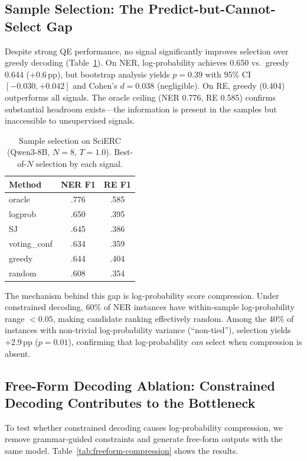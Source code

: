 \documentclass[11pt,a4paper]{article}
\begin{document}
\subsection{Sample Selection: The Predict-but-Cannot-Select Gap}
\label{sec:selection}

Despite strong QE performance, no signal significantly improves selection over greedy decoding (Table~\ref{tab:selection-scierc}). On NER, log-probability achieves 0.650 vs.\ greedy 0.644 (+0.6\,pp), but bootstrap analysis yields $p{=}0.39$ with 95\% CI $[-0.030, +0.042]$ and Cohen's $d{=}0.038$ (negligible). On RE, greedy (0.404) outperforms all signals. The oracle ceiling (NER 0.776, RE 0.585) confirms substantial headroom exists---the information is present in the samples but inaccessible to unsupervised signals.

\begin{table}[t]
\centering
\small
\caption{Sample selection on SciERC (Qwen3-8B, $N{=}8$, $T{=}1.0$). Best-of-$N$ selection by each signal.}
\label{tab:selection-scierc}
\begin{tabular}{lcc}
\toprule
Method & NER F1 & RE F1 \\
\midrule
oracle & .776 & .585 \\
logprob & .650 & .395 \\
SJ & .645 & .386 \\
voting\_conf & .634 & .359 \\
greedy & .644 & .404 \\
random & .608 & .354 \\
\bottomrule
\end{tabular}
\end{table}

The mechanism behind this gap is log-probability score compression. Under constrained decoding, 60\% of NER instances have within-sample log-probability range $< 0.05$, making candidate ranking effectively random. Among the 40\% of instances with non-trivial log-probability variance (``non-tied''), selection yields +2.9\,pp ($p{=}0.01$), confirming that log-probability \emph{can} select when compression is absent.

\subsection{Free-Form Decoding Ablation: Constrained Decoding Contributes to the Bottleneck}
\label{sec:freeform}

To test whether constrained decoding causes log-probability compression, we remove grammar-guided constraints and generate free-form outputs with the same model. Table~\ref{tab:freeform-compression} shows the results.
\end{document}
